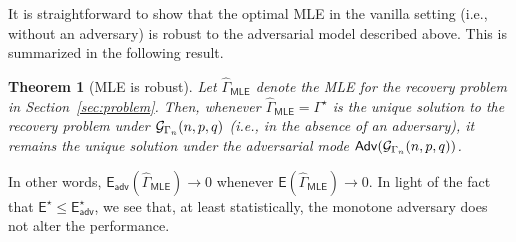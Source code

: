 \documentclass[12pt]{article}
\newtheorem{theorem}{Theorem}
\newcommand{\calG}{{\cal G}}
\newcommand{\s}[1]{\mathsf{#1}}
\begin{document}
It is straightforward to show that the optimal MLE in the vanilla setting (i.e., without an adversary) is robust to the adversarial model described above. This is summarized in the following result.
\begin{theorem}[MLE is robust]\label{thm:MLERobust}
    Let $\hat{\Gamma}_{\s{MLE}}$ denote the MLE for the recovery problem in Section~\ref{sec:problem}. Then, whenever $\hat{\Gamma}_{\s{MLE}}=\Gamma^\star$ is the unique solution to the recovery problem under $\calG_{\Gamma_n}(n,p,q)$ (i.e., in the absence of an adversary), it remains the unique solution under the adversarial mode $\s{Adv}(\calG_{\Gamma_n}(n,p,q))$.
\end{theorem}
In other words, $\s{E}_{\s{adv}}(\hat{\Gamma}_{\s{MLE}})\to0$ whenever $\s{E}(\hat{\Gamma}_{\s{MLE}})\to0$. In light of the fact that $\s{E}^{\star}\leq\s{E}_{\s{adv}}^{\star}$, we see that, at least statistically, the monotone adversary does not alter the performance. 
\end{document}
